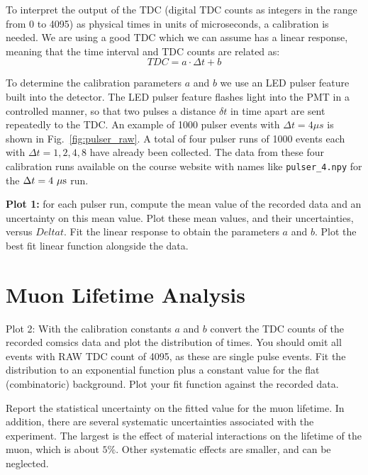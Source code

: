 To interpret the output of the TDC (digital TDC counts as integers in
the range from 0 to 4095) as physical times in units of microseconds,
a calibration is needed.  We are using a good TDC which we can assume has a linear response, meaning that the time interval and TDC counts are related as:
\begin{displaymath}
TDC = a \cdot \Delta t  + b 
\end{displaymath}

To determine the calibration parameters $a$ and $b$ we use an LED
pulser feature built into the detector.  The LED pulser feature
flashes light into the PMT in a controlled manner, so that two pulses
a distance $\delta t$ in time apart are sent repeatedly to the TDC.
An example of 1000 pulser events with $\Delta t = 4 \mu s$ is shown in
Fig.~\ref{fig:pulser_raw}.  A total of four pulser runs of 1000 events
each with $\Delta t = 1,2,4,8$ have already been collected.  The data
from these four calibration runs available on the course website with
names like {\tt pulser{\_}4.npy} for the $\Delta t = 4~\rm \mu s$ run.

{\bf Plot 1:}  for each pulser run, compute the mean value of the recorded data and an uncertainty on this mean value.
Plot these mean values, and their uncertainties, versus $Delta t$.  Fit the linear response to obtain the parameters $a$ and $b$.  Plot the best fit linear function alongside the data.

\section{Muon Lifetime Analysis}

{\rm Plot 2: } With the calibration constants $a$ and $b$ convert the
TDC counts of the recorded comsics data and plot the distribution of
times.  You should omit all events with RAW TDC count of 4095, as
these are single pulse events.  Fit the distribution to an exponential
function plus a constant value for the flat (combinatoric) background.
Plot your fit function against the recorded data.

Report the statistical uncertainty on the fitted value for
the muon lifetime.  In addition, there are several systematic
uncertainties associated with the experiment.  The largest is the
effect of material interactions on the lifetime of the muon, which is
about $5\%$.  Other systematic effects are smaller, and can be
neglected.



